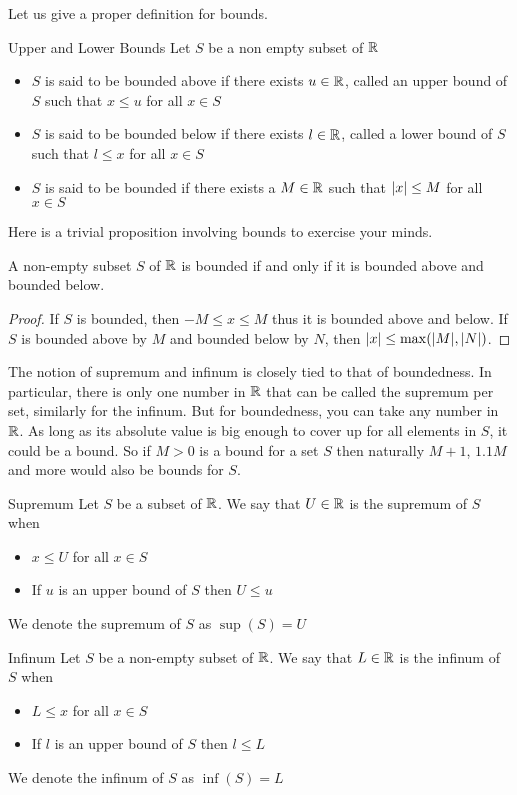 \documentclass[a4paper]{article}
\begin{document}
Let us give a proper definition for bounds. 
\begin{defn}{Upper and Lower Bounds}{} Let $S$ be a non empty subset of $\mathbb{R}$ 
\begin{itemize}
\item $S$ is said to be bounded above if there exists $u\in\mathbb{R}$, called an upper bound of $S$ such that $x\leq u$ for all $x\in S$
\item $S$ is said to be bounded below if there exists $l\in\mathbb{R}$, called a lower bound of $S$ such that $l\leq x$ for all $x\in S$
\item $S$ is said to be bounded if there exists a $M\in\mathbb{R}$ such that $\abs{x}\leq M$ for all $x\in S$
\end{itemize}
\end{defn}

Here is a trivial proposition involving bounds to exercise your minds. 

\begin{prp}{}{} A non-empty subset $S$ of $\mathbb{R}$ is bounded if and only if it is bounded above and bounded below. \tcbline
\begin{proof} If $S$ is bounded, then $-M\leq x\leq M$ thus it is bounded above and below. If $S$ is bounded above by $M$ and bounded below by $N$, then $\abs{x}\leq\max(\abs{M},\abs{N})$. 
\end{proof}
\end{prp}

The notion of supremum and infinum is closely tied to that of boundedness. In particular, there is only one number in $\mathbb{R}$ that can be called the supremum per set, similarly for the infinum. But for boundedness, you can take any number in $\mathbb{R}$. As long as its absolute value is big enough to cover up for all elements in $S$, it could be a bound. So if $M>0$ is a bound for a set $S$ then naturally $M+1$, $1.1M$ and more would also be bounds for $S$. 

\begin{defn}{Supremum}{} Let $S$ be a subset of $\mathbb{R}$. We say that $U\in\mathbb{R}$ is the supremum of $S$ when
\begin{itemize}
\item $x\leq U$ for all $x\in S$
\item If $u$ is an upper bound of $S$ then $U\leq u$
\end{itemize}
We denote the supremum of $S$ as $\sup(S)=U$
\end{defn}

\begin{defn}{Infinum}{} Let $S$ be a non-empty subset of $\mathbb{R}$. We say that $L\in\mathbb{R}$ is the infinum of $S$ when
\begin{itemize}
\item $L\leq x$ for all $x\in S$
\item If $l$ is an upper bound of $S$ then $l\leq L$
\end{itemize}
We denote the infinum of $S$ as $\inf(S)=L$
\end{defn}
\end{document}
